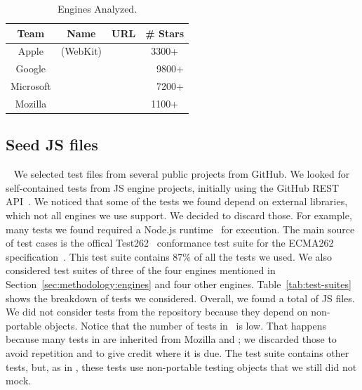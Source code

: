 \documentclass[10pt,conference,anonymous]{IEEEtran}
\begin{document}
\begin{table}[t]
  \centering
  \caption{\label{tab:engines}Engines Analyzed.}
  \begin{tabular}{cccr}
    \toprule
    Team & Name & URL & \# Stars \\
    \midrule
    Apple & \jsc{} (WebKit) & \cite{jsc2018repo} & \multicolumn{1}{c}{3300+} \\
    Google & \veight{} & \cite{v82018repo} & 9800+ \\
    Microsoft & \chakra{} & \cite{chakra2018repo} & 7200+ \\
    Mozilla & \smonkey{} & \cite{spidermonkey2018repo} & \multicolumn{1}{c}{1100+} \\
   \bottomrule     
  \end{tabular}
\end{table}

\subsection{Seed JS files\label{sec:seeds}}~
We selected test files from several public projects from GitHub. We
looked for self-contained tests from JS engine projects, initially
using the GitHub REST API~\cite{github-rest-api}. We noticed that some
of the tests we found depend on external libraries, which not all
engines we use support. We decided to discard those. For example, many
tests we found required a Node.js runtime~\cite{node} for
execution. The main source of test cases is the offical
Test262~\cite{tc39-github} conformance test suite for the ECMA262
specification~\cite{ecmas262-spec}. This test suite contains 87\% of
all the tests we used. We also considered test suites of three of the
four engines mentioned in Section~\ref{sec:methodology:engines} and
four other engines. Table~\ref{tab:test-suites} shows the breakdown of
tests we considered. Overall, we found a total of \totfiles{} JS
files. We did not consider tests from the \chakra{} repository because
they depend on non-portable objects. Notice that the number of tests
in \veight\ is low. That happens because many tests in \veight{} are
inherited from Mozilla and \jsc{}; we discarded those to avoid
repetition and to give credit where it is due. The \veight{} test
suite contains other tests, but, as in \chakra{}, these tests use
non-portable testing objects that we still did not mock.
\end{document}
